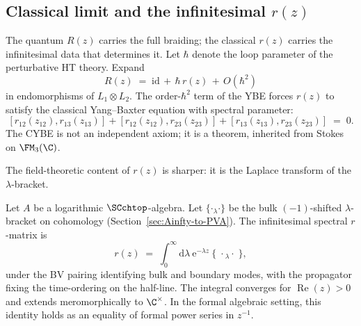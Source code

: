 \subsection{Classical limit and the infinitesimal $r(z)$}
\label{subsec:classical-r}
The quantum $R(z)$ carries the full braiding; the classical $r(z)$ carries the infinitesimal data that determines it. Let $\hbar$ denote the loop parameter of the perturbative HT theory.
Expand
\[
R(z) \;=\; \mathrm{id} \,+\, \hbar\, r(z) \,+\, O(\hbar^2)
\]
in endomorphisms of $L_1\otimes L_2$.
The order-$\hbar^2$ term of the YBE forces $r(z)$ to satisfy the classical Yang--Baxter equation with spectral parameter:
\[
[ r_{12}(z_{12}), r_{13}(z_{13}) ] + [ r_{12}(z_{12}), r_{23}(z_{23}) ] + [ r_{13}(z_{13}), r_{23}(z_{23}) ] \;=\; 0.
\]
The CYBE is not an independent axiom; it is a theorem, inherited from Stokes on $\FM_3(\C)$.

The field-theoretic content of $r(z)$ is sharper: it is the Laplace transform of the $\lambda$-bracket.

\begin{proposition}
\label{prop:field-theory-r}
Let $A$ be a logarithmic $\SCchtop$-algebra.
Let $\{\cdot{}_\lambda \cdot\}$ be the bulk $(-1)$-shifted $\lambda$-bracket on cohomology (Section~\ref{sec:Ainfty-to-PVA}). The infinitesimal spectral $r$-matrix is
\[
r(z) \;=\; \int_{0}^{\infty} \! \mathrm{d}\lambda\ \mathrm{e}^{-\lambda z}\ \bigl\{\; \cdot {}_\lambda \cdot \;\bigr\},
\]
under the BV pairing identifying bulk and boundary modes, with the propagator fixing the time-ordering on the half-line. The integral converges for $\operatorname{Re}(z) > 0$ and extends meromorphically to $\C^\times$. In the formal algebraic setting, this identity holds as an equality of formal power series in $z^{-1}$.
\end{proposition}

